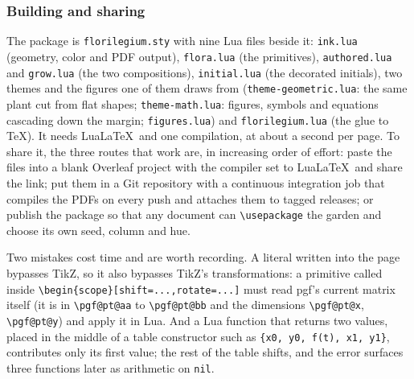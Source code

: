 \subsubsection{Building and sharing}

The package is \texttt{florilegium.sty} with nine Lua files beside it: \texttt{ink.lua}
(geometry, color and PDF output), \texttt{flora.lua} (the primitives),
\texttt{authored.lua} and \texttt{grow.lua} (the two compositions), \texttt{initial.lua}
(the decorated initials), two themes and the figures one of them draws from
(\texttt{theme-geometric.lua}: the same plant cut from flat shapes;
\texttt{theme-math.lua}: figures, symbols and equations cascading down the margin;
\texttt{figures.lua}) and \texttt{florilegium.lua} (the glue to \TeX). It needs Lua\LaTeX\ and one compilation, at
about a second per page. To share it, the three routes that work are, in increasing order
of effort: paste the files into a blank Overleaf project with the compiler set to
Lua\LaTeX\ and share the link; put them in a Git repository with a continuous integration
job that compiles the PDFs on every push and attaches them to tagged releases; or publish
the package so that any document can \texttt{\textbackslash usepackage} the garden and
choose its own seed, column and hue.

\begin{remark}
Two mistakes cost time and are worth recording. A literal written into the page bypasses
TikZ, so it also bypasses TikZ's transformations: a primitive called inside
\verb|\begin{scope}[shift=...,rotate=...]| must read pgf's current matrix itself (it is in
\verb|\pgf@pt@aa| to \verb|\pgf@pt@bb| and the dimensions \verb|\pgf@pt@x|,
\verb|\pgf@pt@y|) and apply it in Lua. And a Lua function that returns two values, placed
in the middle of a table constructor such as \verb|{x0, y0, f(t), x1, y1}|, contributes only
its first value; the rest of the table shifts, and the error surfaces three functions
later as arithmetic on \texttt{nil}.
\end{remark}
